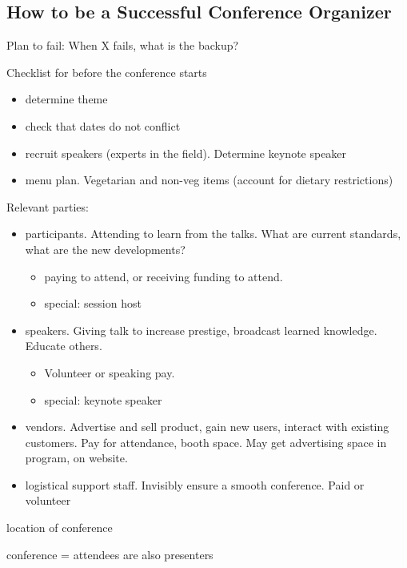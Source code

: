 \subsection{How to be a Successful Conference Organizer}


Plan to fail: When X fails, what is the backup?


Checklist for before the conference starts
\begin{itemize}
    \item determine theme
    \item check that dates do not conflict
    \item recruit speakers (experts in the field).
Determine keynote speaker
\item menu plan. 
Vegetarian and non-veg items (account for dietary restrictions)
\end{itemize}




Relevant parties:
\begin{itemize}
    \item participants. Attending to learn from the talks. What are current standards, what are the new developments?
    \begin{itemize}
        \item paying to attend, or receiving funding to attend. 
        \item special: session host
    \end{itemize}
    \item speakers. Giving talk to increase prestige, broadcast learned knowledge. Educate others.
    \begin{itemize}
        \item Volunteer or speaking pay. 
        \item special: keynote speaker
    \end{itemize}
    \item vendors. Advertise and sell product, gain new users, interact with existing customers. Pay for attendance, booth space. May get advertising space in program, on website.
    \item logistical support staff. Invisibly ensure a smooth conference. 
Paid or volunteer
\end{itemize}


location of conference

conference = attendees are also presenters

